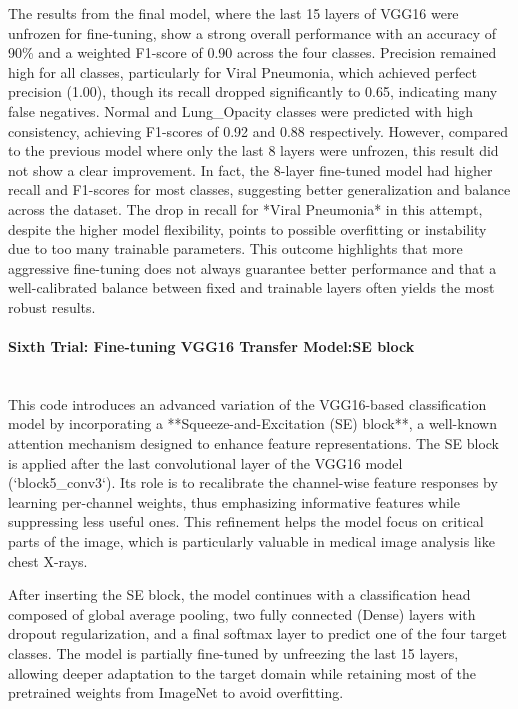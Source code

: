 \documentclass{article}
\begin{document}
The results from the final model, where the last 15 layers of VGG16 were unfrozen for fine-tuning, show a strong overall performance with an accuracy of 90\% and a weighted F1-score of 0.90 across the four classes. Precision remained high for all classes, particularly for Viral Pneumonia, which achieved perfect precision (1.00), though its recall dropped significantly to 0.65, indicating many false negatives. Normal and Lung\_Opacity classes were predicted with high consistency, achieving F1-scores of 0.92 and 0.88 respectively. 
However, compared to the previous model where only the last 8 layers were unfrozen, this result did not show a clear improvement. In fact, the 8-layer fine-tuned model had higher recall and F1-scores for most classes, suggesting better generalization and balance across the dataset. The drop in recall for *Viral Pneumonia* in this attempt, despite the higher model flexibility, points to possible overfitting or instability due to too many trainable parameters. This outcome highlights that more aggressive fine-tuning does not always guarantee better performance and that a well-calibrated balance between fixed and trainable layers often yields the most robust results.

\paragraph{Sixth Trial: Fine-tuning VGG16 Transfer Model:SE block}\mbox{}\\
This code introduces an advanced variation of the VGG16-based classification model by incorporating a **Squeeze-and-Excitation (SE) block**, a well-known attention mechanism designed to enhance feature representations. The SE block is applied after the last convolutional layer of the VGG16 model (`block5\_conv3`). Its role is to recalibrate the channel-wise feature responses by learning per-channel weights, thus emphasizing informative features while suppressing less useful ones. This refinement helps the model focus on critical parts of the image, which is particularly valuable in medical image analysis like chest X-rays.

After inserting the SE block, the model continues with a classification head composed of global average pooling, two fully connected (Dense) layers with dropout regularization, and a final softmax layer to predict one of the four target classes. The model is partially fine-tuned by unfreezing the last 15 layers, allowing deeper adaptation to the target domain while retaining most of the pretrained weights from ImageNet to avoid overfitting.
\end{document}
